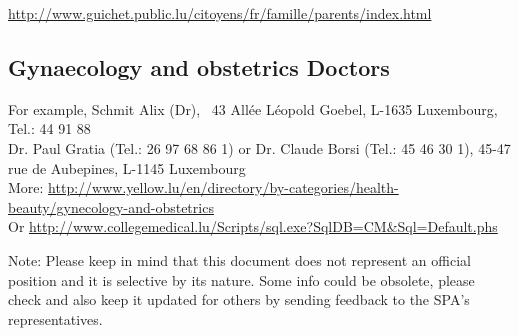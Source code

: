 \url{http://www.guichet.public.lu/citoyens/fr/famille/parents/index.html}


\subsection{Gynaecology and obstetrics Doctors}
For example, Schmit Alix (Dr), \
43 All\'ee L\'eopold Goebel, L-1635 Luxembourg, Tel.: 44 91 88 \\
Dr. Paul Gratia (Tel.: 26 97 68 86 1) or Dr. Claude Borsi (Tel.: 45 46 30 1), 45-47 rue de Aubepines, L-1145 Luxembourg\\
More: \url{http://www.yellow.lu/en/directory/by-categories/health-beauty/gynecology-and-obstetrics}\\
Or \url{http://www.collegemedical.lu/Scripts/sql.exe?SqlDB=CM&Sql=Default.phs}
 
Note:
Please keep in mind that this document does not represent an official position and it is selective by its nature.
Some info could be obsolete, please check and also keep it updated for others by sending feedback to the SPA's representatives. 